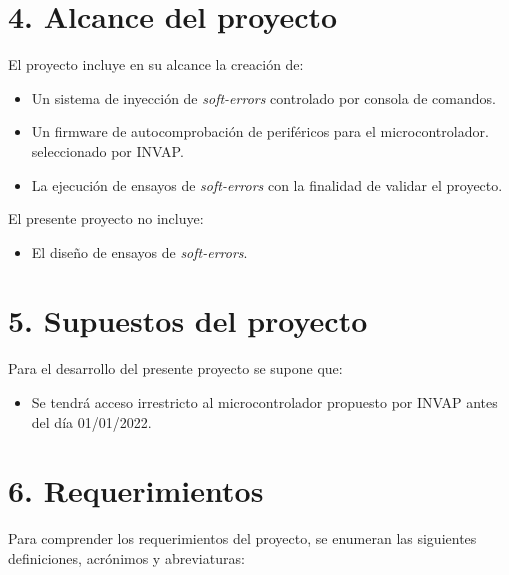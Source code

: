 \documentclass[
11pt, %
]{charter}
\begin{document}
\section{4. Alcance del proyecto}
\label{sec:alcance}

El proyecto incluye en su alcance la creación de:
\begin{itemize}
	\item Un sistema de inyección de \emph{soft-errors} controlado por consola de comandos.
	\item Un firmware de autocomprobación de periféricos para el microcontrolador. seleccionado por INVAP.
	\item La ejecución de ensayos de \emph{soft-errors} con la finalidad de validar el proyecto.
\end{itemize}

El presente proyecto no incluye:

\begin{itemize}
	\item El diseño de ensayos de \emph{soft-errors}.
\end{itemize}


\section{5. Supuestos del proyecto}
\label{sec:supuestos}

Para el desarrollo del presente proyecto se supone que:

\begin{itemize}
	\item Se tendrá acceso irrestricto al microcontrolador propuesto por INVAP antes del día 01/01/2022.
\end{itemize}


\section{6. Requerimientos}
\label{sec:requerimientos}

Para comprender los requerimientos del proyecto, se enumeran las siguientes definiciones, acrónimos y abreviaturas:
\end{document}
